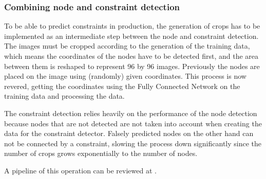 \subsubsection{Combining node and constraint detection} \label{ch:combine_node_constraint_detection}

To be able to predict constraints in production, the generation of crops has to be implemented as an intermediate step between the node and constraint detection.
The images must be cropped according to the generation of the training data, which means the coordinates of the nodes have to be detected first, and the area between them is reshaped to represent 96 by 96 images.
Previously the nodes are placed on the image using (randomly) given coordinates.
This process is now revered, getting the coordinates using the Fully Connected Network on the training data and processing the data.

The constraint detection relies heavily on the performance of the node detection because nodes that are not detected are not taken into account when creating the data for the constraint detector.
Falsely predicted nodes on the other hand can not be connected by a constraint, slowing the process down significantly since the number of crops grows exponentially to the number of nodes.

A pipeline of this operation can be reviewed at .


